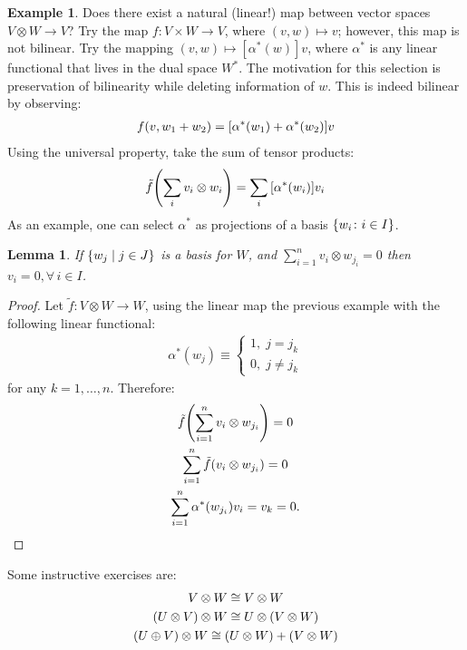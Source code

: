 \documentclass{article}
\newtheorem{Lemma}{Lemma}
\theoremstyle{definition}
\newtheorem*{Example*}{Example}
\theoremstyle{remark}
\theoremstyle{underline}
\theoremstyle{underline}
\begin{document}
	\begin{Example*}
		Does there exist a natural (linear!) map between vector spaces $V \otimes W \to V$? Try the map $f \colon V \times W \to V$, where $(v, w) \mapsto v$; however, this map is not bilinear. Try the mapping $(v,w) \mapsto [\alpha^*(w)]v$, where $\alpha^*$ is any linear functional that lives in the dual space $W^*$. The motivation for this selection is preservation of	bilinearity while deleting information of $w$. This is indeed bilinear by observing:
		\begin{gather*}
			f(v, w_1 + w_2) = \bqty{\alpha^*(w_1) + \alpha^*(w_2)}v
		\end{gather*}
		Using the universal property, take the sum of tensor products:
		\begin{gather*}
			\tilde f\pqty{\sum_{i} v_i \otimes w_i} = \sum_i \bqty{\alpha^*(w_i)}v_i
		\end{gather*}
		As an example, one can select $\alpha^*$ as projections of a basis $\qty{w_i \colon i \in I}$.
	\end{Example*}

		\begin{Lemma}\label{lem:tensProdBasis}
		If $\qty{w_j \mid j \in J}$ is a basis for $W$, and $ \sum\limits_{i=1}^n v_i \otimes w_{j_i} = 0 $	then $v_i = 0, \forall\,i \in I$.
	\end{Lemma}
	\begin{proof}
		Let $\tilde f \colon V \otimes W \to W$, using the linear map the previous example with the following linear functional:
		\begin{gather*}
			\alpha^*(w_j) \equiv \begin{cases}
        1, \; j = j_k \\
        0, \; j \neq j_k 
        \end{cases}
		\end{gather*}
		for any $k = 1, \ldots, n$. Therefore:
		\begin{gather*}
			\tilde f \pqty{\sum_{i=1}^n v_i \otimes w_{j_i}} = 0\\
			\sum_{i=1}^n \tilde f\pqty{v_i \otimes w_{j_i}} = 0 \\
			\sum_{i=1}^n \alpha^*\pqty{w_{j_i}} v_i = v_k = 0.
		\end{gather*}
	\end{proof}

	Some instructive exercises are:
	\begin{gather*}
		V \otimes W \cong V \otimes W \\
		\pqty{U \otimes V} \otimes W \cong U \otimes \pqty{V \otimes W} \\
		\pqty{U \oplus V} \otimes W \cong \pqty{U \otimes W} + \pqty{V \otimes W} 
	\end{gather*}
\end{document}
